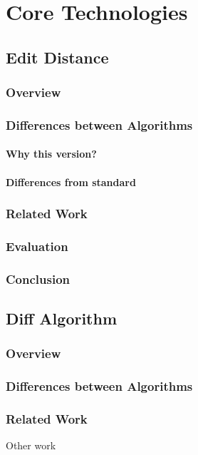 
\part{Core Technologies}

\chapter{Edit Distance}
    \section{Overview}
    \section{Differences between Algorithms}
        \subsection{Why this version?}
        \subsection{Differences from standard}
    \section{Related Work}
    \section{Evaluation}
    \section{Conclusion}

\chapter{Diff Algorithm}
    \section{Overview}
    \section{Differences between Algorithms}
    \section{Related Work}
        Other work~\cite{White2010,Fong2010}
